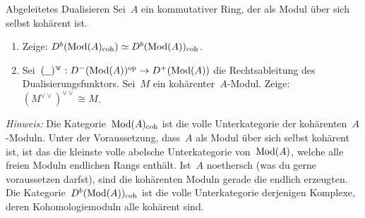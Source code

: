 \documentclass{uebblatt}
\newcommand{\dd}{{\vee\!\!\!\vee}}
\begin{document}

\begin{aufgabe}{Abgeleitetes Dualisieren}
Sei~$A$ ein kommutativer Ring, der als Modul über sich selbst kohärent ist.
\begin{enumerate}
\item Zeige: $D^b(\mathrm{Mod}(A)_\mathrm{coh}) \simeq D^b(\mathrm{Mod}(A))_\mathrm{coh}$.
\item Sei~$(\smallplaceholder)^\dd : D^-(\Mod(A))^\op \to D^+(\Mod(A))$ die
Rechtsableitung des Dualisierungsfunktors. Sei~$M$ ein kohärenter~$A$-Modul.
Zeige: $(M^\dd)^\dd \cong M$.
\end{enumerate}

{\tiny\emph{Hinweis:} Die Kategorie~$\mathrm{Mod}(A)_\mathrm{coh}$ ist die volle
Unterkategorie der kohärenten~$A$-Moduln. Unter der Voraussetzung, dass~$A$ als
Modul über sich selbst kohärent ist, ist das die kleinste volle
abelsche Unterkategorie von~$\mathrm{Mod}(A)$, welche alle freien Moduln endlichen
Rangs enthält. Ist~$A$ noethersch (was du gerne
voraussetzen darfst), sind die kohärenten Moduln gerade die endlich erzeugten.
Die Kategorie~$D^b(\mathrm{Mod}(A))_\mathrm{coh}$ ist die volle Unterkategorie
derjenigen Komplexe, deren Kohomologiemoduln alle kohärent sind.\par}
\end{aufgabe}
\end{document}
